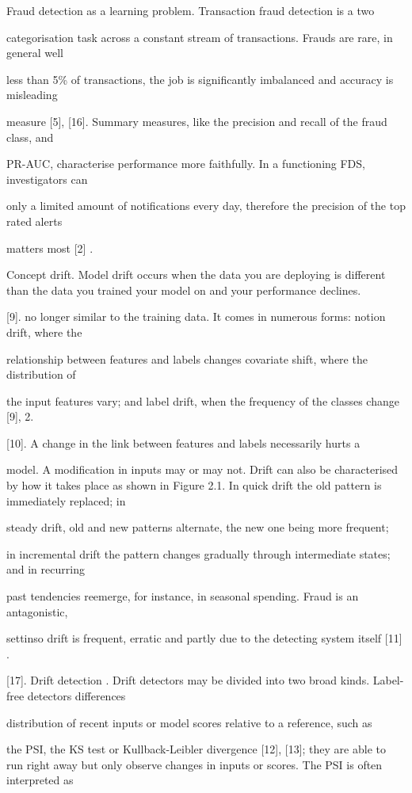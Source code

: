 \documentclass[11pt,letterpaper]{report}
\begin{document}
Fraud detection as a learning problem. Transaction fraud detection is a two

categorisation task across a constant stream of transactions. Frauds are rare, in general well

less than 5\% of transactions, the job is significantly imbalanced and accuracy is misleading

measure [5], [16]. Summary measures, like the precision and recall of the fraud class, and

PR-AUC, characterise performance more faithfully. In a functioning FDS, investigators can

only a limited amount of notifications every day, therefore the precision of the top rated alerts

matters most [2] .

Concept drift. Model drift occurs when the data you are deploying is different than the data you trained your model on and your performance declines.

[9]. no longer similar to the training data. It comes in numerous forms: notion drift, where the

relationship between features and labels changes covariate shift, where the distribution of

the input features vary; and label drift, when the frequency of the classes change [9], 2.

[10]. A change in the link between features and labels necessarily hurts a

model. A modification in inputs may or may not. Drift can also be characterised by how it takes place as shown in Figure 2.1. In quick drift the old pattern is immediately replaced; in

steady drift, old and new patterns alternate, the new one being more frequent;

in incremental drift the pattern changes gradually through intermediate states; and in recurring

past tendencies reemerge, for instance, in seasonal spending. Fraud is an antagonistic,

settinso drift is frequent, erratic and partly due to the detecting system itself [11] .

[17]. Drift detection . Drift detectors may be divided into two broad kinds. Label-free detectors differences

distribution of recent inputs or model scores relative to a reference, such as

the PSI, the KS test or Kullback-Leibler divergence [12], [13]; they are able to run right away but only observe changes in inputs or scores. The PSI is often interpreted as
\end{document}
